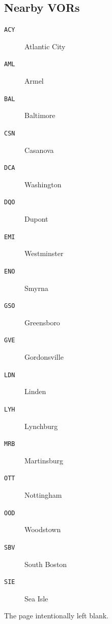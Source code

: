 \documentclass[fontsize=10pt, paper=letter]{article}
\newcommand{\VOR}[1]{\texttt{#1}}
\newcommand{\ACY}{Atlantic City}
\newcommand{\AML}{Armel}
\newcommand{\BAL}{Baltimore}
\newcommand{\CSN}{Casanova}
\newcommand{\DCA}{Washington}
\newcommand{\DQO}{Dupont}
\newcommand{\EMI}{Westminster}
\newcommand{\ENO}{Smyrna}
\newcommand{\GSO}{Greensboro}
\newcommand{\GVE}{Gordonsville}
\newcommand{\LDN}{Linden}
\newcommand{\LYH}{Lynchburg}
\newcommand{\MRB}{Martinsburg}
\newcommand{\OTT}{Nottingham}
\newcommand{\OOD}{Woodstown}
\newcommand{\SBV}{South Boston}
\newcommand{\SIE}{Sea Isle}
\begin{document}
\clearpage

\subsection{Nearby VORs}

\begin{multicols}{2}
\begin{description}

\item[\VOR{ACY}] \ACY
\item[\VOR{AML}] \AML
\item[\VOR{BAL}] \BAL
\item[\VOR{CSN}] \CSN
\item[\VOR{DCA}] \DCA
\item[\VOR{DQO}] \DQO
\item[\VOR{EMI}] \EMI
\item[\VOR{ENO}] \ENO
\item[\VOR{GSO}] \GSO
\item[\VOR{GVE}] \GVE
\item[\VOR{LDN}] \LDN
\item[\VOR{LYH}] \LYH
\item[\VOR{MRB}] \MRB
\item[\VOR{OTT}] \OTT
\item[\VOR{OOD}] \OOD
\item[\VOR{SBV}] \SBV
\item[\VOR{SIE}] \SIE


\end{description}
\end{multicols}


\clearpage
\null
\vfill

\begin{center}
{\large The page intentionally left blank.}
\end{center}

\vfill
\end{document}

